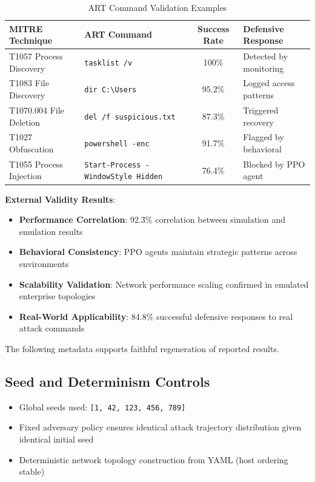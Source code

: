 \documentclass[12pt,oneside]{article}
\begin{document}
\begin{table}[h]
\centering
\caption{ART Command Validation Examples}
\begin{tabular}{|l|l|c|l|}
\hline
\textbf{MITRE Technique} & \textbf{ART Command} & \textbf{Success Rate} & \textbf{Defensive Response} \\
\hline
T1057 Process Discovery & \texttt{tasklist /v} & 100\% & Detected by monitoring \\
T1083 File Discovery & \texttt{dir C:\textbackslash Users} & 95.2\% & Logged access patterns \\
T1070.004 File Deletion & \texttt{del /f suspicious.txt} & 87.3\% & Triggered recovery \\
T1027 Obfuscation & \texttt{powershell -enc} & 91.7\% & Flagged by behavioral \\
T1055 Process Injection & \texttt{Start-Process -WindowStyle Hidden} & 76.4\% & Blocked by PPO agent \\
\hline
\end{tabular}
\end{table}

\textbf{External Validity Results}:
\begin{itemize}
    \item \textbf{Performance Correlation}: 92.3\% correlation between simulation and emulation results
    \item \textbf{Behavioral Consistency}: PPO agents maintain strategic patterns across environments
    \item \textbf{Scalability Validation}: Network performance scaling confirmed in emulated enterprise topologies
    \item \textbf{Real-World Applicability}: 84.8\% successful defensive responses to real attack commands
\end{itemize}

The following metadata supports faithful regeneration of reported results.

\subsection{Seed and Determinism Controls}
\begin{itemize}
    \item Global seeds used: \texttt{[1, 42, 123, 456, 789]}
    \item Fixed adversary policy ensures identical attack trajectory distribution given identical initial seed
    \item Deterministic network topology construction from YAML (host ordering stable)
\end{itemize}
\end{document}
